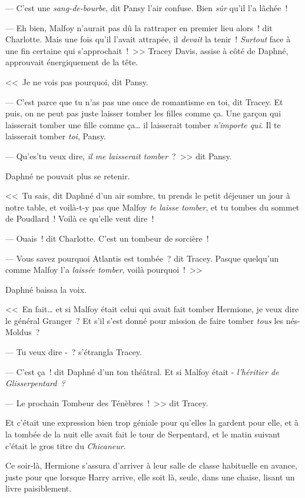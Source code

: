 --- C'est une \emph{sang-de-bourbe}, dit Pansy l'air confuse. Bien \emph{sûr} qu'il l'a lâchée~!

--- Eh bien, Malfoy n'aurait pas dû la rattraper en premier lieu alors~! dit Charlotte. Mais une fois qu'il l'avait attrapée, il \emph{devait} la tenir~! \emph{Surtout} face à une fin certaine qui s'approchait~!~>> Tracey Davis, assise à côté de Daphné, approuvait énergiquement de la tête.

<<~Je ne vois pas pourquoi, dit Pansy.

--- C'est parce que tu n'as pas une once de romantisme en toi, dit Tracey. Et puis, on ne peut pas juste laisser tomber les filles comme ça. Une garçon qui laisserait tomber une fille comme ça… il laisserait tomber \emph{n'importe qui}. Il te laisserait tomber \emph{toi}, Pansy.

--- Qu'es'tu veux dire, \emph{il me laisserait tomber}~?~>> dit Pansy.

Daphné ne pouvait plus se retenir.

<<~Tu sais, dit Daphné d'un air sombre, tu prends le petit déjeuner un jour à notre table, et voilà-t-y pas que Malfoy \emph{te laisse tomber}, et tu tombes du sommet de Poudlard~! Voilà ce qu'elle veut dire~!

--- Ouais~! dit Charlotte. C'est un tombeur de sorcière~!

--- Vous savez pourquoi Atlantis est tombée~? dit Tracey. Pasque quelqu'un comme Malfoy l'a \emph{laissée tomber}, voilà pourquoi~!~>>

Daphné baissa la voix.

<<~En fait… et si Malfoy était celui qui avait fait tomber Hermione, je veux dire le général Granger~? Et s'il s'est donné pour mission de faire tomber \emph{tous} les nés-Moldus~?

--- Tu veux dire -~? s'étrangla Tracey.

--- C'est ça~! dit Daphné d'un ton théâtral. Et si Malfoy était - \emph{l'héritier de Glisserpentard~?}

--- Le prochain Tombeur des Ténèbres~!~>> dit Tracey.

Et c'était une expression bien trop géniale pour qu'elles la gardent pour elle, et à la tombée de la nuit elle avait fait le tour de Serpentard, et le matin suivant c'était le gros titre du \emph{Chicaneur}.


Ce soir-là, Hermione s'assura d'arriver à leur salle de classe habituelle en avance, juste pour que lorsque Harry arrive, elle soit là, seule, dans une chaise, lisant un livre paisiblement.

